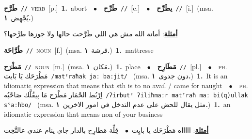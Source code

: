 \documentclass[10pt,a4paper,twoside]{article} %
\begin{document}
\begin{multicols}{2}
{\setlength\topsep{0pt}\textbf{\foreignlanguage{arabic}{طَرَّح}}\ {\color{gray}\texttt{//}\color{black}}\ \textsc{verb}\ [p.]\ \textbf{1.}~abort\ \ $\bullet$\ \ \setlength\topsep{0pt}\textbf{\foreignlanguage{arabic}{طَرِّح}}\ {\color{gray}\texttt{//}\color{black}}\ [c.]\ \ $\bullet$\ \ \setlength\topsep{0pt}\textbf{\foreignlanguage{arabic}{يطَرِّح}}\ {\color{gray}\texttt{//}\color{black}}\ [i.]\ \color{gray}(msa. \foreignlanguage{arabic}{يُجْهِض}~\foreignlanguage{arabic}{\textbf{١.}})\color{black}\  \begin{flushright}\color{gray}\foreignlanguage{arabic}{\textbf{\underline{\foreignlanguage{arabic}{أمثلة}}}: أمانة الله مش هي اللي طَرَّحت حالها ولا جوزها طرَّحها؟}\end{flushright}\color{black}} \vspace{2mm}

{\setlength\topsep{0pt}\textbf{\foreignlanguage{arabic}{طُرَّاحَة}}\ {\color{gray}\texttt{//}\color{black}}\ \textsc{noun}\ [f.]\ \color{gray}(msa. \foreignlanguage{arabic}{فرشة}~\foreignlanguage{arabic}{\textbf{١.}})\color{black}\ \textbf{1.}~mattresse\ } \vspace{2mm}

{\setlength\topsep{0pt}\textbf{\foreignlanguage{arabic}{مَطْرَح}}\ {\color{gray}\texttt{//}\color{black}}\ \textsc{noun}\ [m.]\ \color{gray}(msa. \foreignlanguage{arabic}{مَكان}~\foreignlanguage{arabic}{\textbf{١.}})\color{black}\ \textbf{1.}~place\ \ $\bullet$\ \ \setlength\topsep{0pt}\textbf{\foreignlanguage{arabic}{مَطَارِح}}\ {\color{gray}\texttt{//}\color{black}}\ [pl.]\ \ $\bullet$\ \ \textsc{ph.} \color{gray} \foreignlanguage{arabic}{مَطْرَحَك يَا بَايت}\color{black}\ {\color{gray}\texttt{/{\sffamily matˤraħak jaː baːjit}/}\color{black}}\ \color{gray} (msa. \foreignlanguage{arabic}{دون جدوى}~\foreignlanguage{arabic}{\textbf{١.}})\color{black}\ \textbf{1.}~It is an idiomatic expression that means that sth is to no avail / came for naught\ \ $\bullet$\ \ \textsc{ph.} \color{gray} \foreignlanguage{arabic}{اِرْبُط الحْمَار مَطْرَح مَا بِيقُلَّك صَاحْبُه}\color{black}\ {\color{gray}\texttt{/{\sffamily ʔirbutˤ ʔiliħmaːr matˤraħ maː bi(q)ullak sˤaːħbo}/}\color{black}}\ \color{gray} (msa. \foreignlanguage{arabic}{مثل يقال للحض على عدم التدخل في امور الاخرين}~\foreignlanguage{arabic}{\textbf{١.}})\color{black}\ \textbf{1.}~an idiomatic expression that means non of your business\  \begin{flushright}\color{gray}\foreignlanguage{arabic}{\textbf{\underline{\foreignlanguage{arabic}{أمثلة}}}: اااااه مَطْرَحَك يا بايِت\ $\bullet$\ \  قِلِّة مَطارِح بالدار جاي ينام عندي عالتَّخِت}\end{flushright}\color{black}} \vspace{2mm}


\end{multicols}
\end{document}
